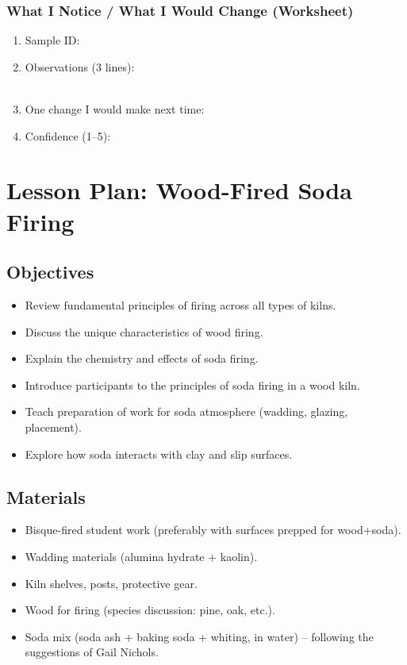 \documentclass[12pt]{scrartcl}
\begin{document}
\subsubsection*{What I Notice / What I Would Change (Worksheet)}
\begin{enumerate}
  \item Sample ID: \hrulefill\\
  \item Observations (3 lines): \hrulefill\\ \hrulefill\\ \hrulefill
  \item One change I would make next time: \hrulefill\\
  \item Confidence (1–5): \hrulefill
\end{enumerate}


\newpage
\section*{Lesson Plan: Wood-Fired Soda Firing}

\subsection*{Objectives}
\begin{itemize}
    \item Review fundamental principles of firing across all types of kilns.
    \item Discuss the unique characteristics of wood firing.
    \item Explain the chemistry and effects of soda firing.
    \item Introduce participants to the principles of soda firing in a wood kiln.
    \item Teach preparation of work for soda atmosphere (wadding, glazing, placement).
    \item Explore how soda interacts with clay and slip surfaces.
\end{itemize}

\subsection*{Materials}
\begin{itemize}
  \item Bisque-fired student work (preferably with  surfaces prepped for wood+soda).
  \item Wadding materials (alumina hydrate + kaolin).
  \item Kiln shelves, posts, protective gear.
  \item Wood for firing (species discussion: pine, oak, etc.).
  \item Soda mix (soda ash + baking soda + whiting, in water) -- following the suggestions of Gail Nichols.
\end{itemize}
\end{document}
